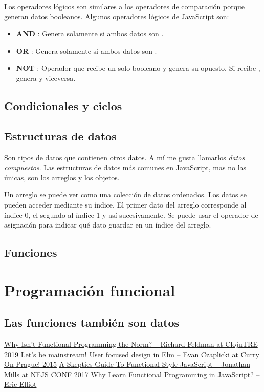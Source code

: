 \documentclass{article}
\newcommand{\code}[1]{\tcbox{\texttt{#1}}}
\newcommand{\codejs}[1]{\tcbox{\lstinline[style=ES6]{#1}}}
\newcommand{\operator}[2]{\item \textbf{#1} \codejs{#2}:}
\begin{document}
\medskip
Los operadores lógicos son similares a los operadores de comparación porque generan datos booleanos. Algunos operadores lógicos de JavaScript son:
\begin{itemize}
  \operator{AND}{\&\&} Genera \code{true} solamente si ambos datos son \code{true}.
  \operator{OR}{||} Genera \code{false} solamente si ambos datos son \code{false}.
  \operator{NOT}{!} Operador que recibe un solo booleano y genera su opuesto. Si recibe \code{true}, genera \code{false} y viceversa.
\end{itemize}


\subsection*{Condicionales y ciclos}

\subsection*{Estructuras de datos}
Son tipos de datos que contienen otros datos. A mí me gusta llamarlos \textit{datos compuestos}. Las estructuras de datos más comunes en JavaScript, mas no las únicas, son los arreglos y los objetos.

Un arreglo se puede ver como una colección de datos ordenados. Los datos se pueden acceder mediante su índice. El primer dato del arreglo corresponde al índice 0, el segundo al índice 1 y así sucesivamente. Se puede usar el operador de asignación \code{=} para indicar qué dato guardar en un índice del arreglo.


\subsection*{Funciones}

\section*{Programación funcional}

\subsection*{Las funciones también son datos}


\pagebreak
\begin{thebibliography}{99}
   \href{https://youtu.be/QyJZzq0v7Z4}{Why Isn't Functional Programming the Norm? – Richard Feldman at ClojuTRE 2019}
   \href{https://youtu.be/oYk8CKH7OhE?t=2133}{Let's be mainstream! User focused design in Elm – Evan Czaplicki at Curry On Prague! 2015}
   \href{https://youtu.be/oF9XTJoScOE?t=1253}{A Skeptics Guide To Functional Style JavaScript – Jonathan Mills at NEJS CONF 2017}
   \href{https://medium.com/javascript-scene/why-learn-functional-programming-in-javascript-composing-software-ea13afc7a257}{Why Learn Functional Programming in JavaScript? – Eric Elliot}
\end{thebibliography}
\end{document}
